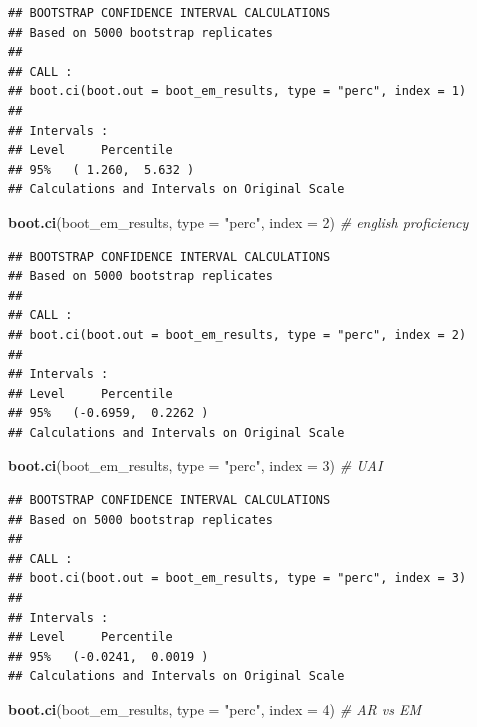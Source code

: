 \documentclass[
]{article}
\newenvironment{Shaded}{\begin{snugshade}}{\end{snugshade}}
\newcommand{\AttributeTok}[1]{\textcolor[rgb]{0.13,0.29,0.53}{#1}}
\newcommand{\CommentTok}[1]{\textcolor[rgb]{0.56,0.35,0.01}{\textit{#1}}}
\newcommand{\DecValTok}[1]{\textcolor[rgb]{0.00,0.00,0.81}{#1}}
\newcommand{\FunctionTok}[1]{\textcolor[rgb]{0.13,0.29,0.53}{\textbf{#1}}}
\newcommand{\NormalTok}[1]{#1}
\newcommand{\StringTok}[1]{\textcolor[rgb]{0.31,0.60,0.02}{#1}}
\begin{document}
\begin{verbatim}
## BOOTSTRAP CONFIDENCE INTERVAL CALCULATIONS
## Based on 5000 bootstrap replicates
## 
## CALL : 
## boot.ci(boot.out = boot_em_results, type = "perc", index = 1)
## 
## Intervals : 
## Level     Percentile     
## 95%   ( 1.260,  5.632 )  
## Calculations and Intervals on Original Scale
\end{verbatim}

\begin{Shaded}
\begin{Highlighting}[]
\FunctionTok{boot.ci}\NormalTok{(boot\_em\_results, }\AttributeTok{type =} \StringTok{"perc"}\NormalTok{, }\AttributeTok{index =} \DecValTok{2}\NormalTok{) }\CommentTok{\# english proficiency}
\end{Highlighting}
\end{Shaded}

\begin{verbatim}
## BOOTSTRAP CONFIDENCE INTERVAL CALCULATIONS
## Based on 5000 bootstrap replicates
## 
## CALL : 
## boot.ci(boot.out = boot_em_results, type = "perc", index = 2)
## 
## Intervals : 
## Level     Percentile     
## 95%   (-0.6959,  0.2262 )  
## Calculations and Intervals on Original Scale
\end{verbatim}

\begin{Shaded}
\begin{Highlighting}[]
\FunctionTok{boot.ci}\NormalTok{(boot\_em\_results, }\AttributeTok{type =} \StringTok{"perc"}\NormalTok{, }\AttributeTok{index =} \DecValTok{3}\NormalTok{) }\CommentTok{\# UAI}
\end{Highlighting}
\end{Shaded}

\begin{verbatim}
## BOOTSTRAP CONFIDENCE INTERVAL CALCULATIONS
## Based on 5000 bootstrap replicates
## 
## CALL : 
## boot.ci(boot.out = boot_em_results, type = "perc", index = 3)
## 
## Intervals : 
## Level     Percentile     
## 95%   (-0.0241,  0.0019 )  
## Calculations and Intervals on Original Scale
\end{verbatim}

\begin{Shaded}
\begin{Highlighting}[]
\FunctionTok{boot.ci}\NormalTok{(boot\_em\_results, }\AttributeTok{type =} \StringTok{"perc"}\NormalTok{, }\AttributeTok{index =} \DecValTok{4}\NormalTok{) }\CommentTok{\# AR vs EM}
\end{Highlighting}
\end{Shaded}
\end{document}
